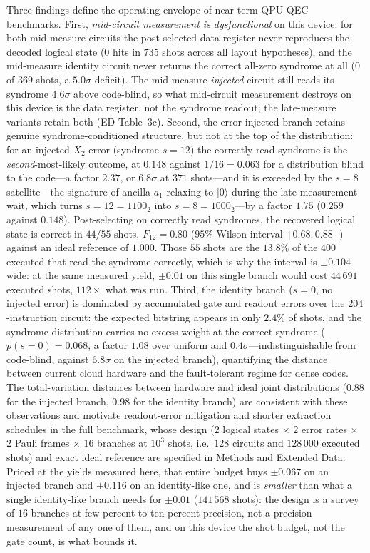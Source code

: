 \documentclass[aps,prxquantum,reprint,superscriptaddress]{revtex4-2}
\newcommand{\ket}[1]{\lvert #1\rangle}
\begin{document}
Three findings define the operating envelope of near-term QPU QEC
benchmarks. First, \emph{mid-circuit measurement is dysfunctional} on this
device: for both mid-measure circuits the post-selected data register never
reproduces the decoded logical state ($0$ hits in $735$ shots across all
layout hypotheses), and the mid-measure identity circuit never returns the
correct all-zero syndrome at all ($0$ of $369$ shots, a $5.0\sigma$ deficit).
The mid-measure \emph{injected} circuit still reads its syndrome $4.6\sigma$
above code-blind, so what mid-circuit measurement destroys on this device is
the data register, not the syndrome readout; the late-measure variants retain
both (ED Table~3c). Second, the error-injected branch retains genuine
syndrome-conditioned structure, but not at the top of the distribution: for an
injected $X_2$ error (syndrome $s=12$) the correctly read syndrome is the
\emph{second}-most-likely outcome, at $0.148$ against $1/16=0.063$ for a
distribution blind to the code---a factor $2.37$, or $6.8\sigma$ at $371$
shots---and it is exceeded by the
$s=8$ satellite---the signature of ancilla $a_1$ relaxing to $\ket 0$ during
the late-measurement wait, which turns $s=12=1100_2$ into $s=8=1000_2$---by a
factor $1.75$ ($0.259$ against $0.148$). Post-selecting on correctly read
syndromes, the recovered logical state is correct in $44/55$ shots,
$F_{12}=0.80$ ($95\%$ Wilson interval $[0.68,0.88]$) against an ideal
reference of $1.000$. Those $55$ shots are the $13.8\%$ of the $400$ executed
that read the syndrome correctly, which is why the interval is $\pm0.104$ wide:
at the same measured yield, $\pm0.01$ on this single branch would cost
$44\,691$ executed shots, $112\times$ what was run. Third, the
identity branch ($s=0$, no injected error) is dominated by accumulated
gate and readout errors over the $204$-instruction circuit: the expected
bitstring appears in only $2.4\%$ of shots, and the syndrome distribution
carries no excess weight at the correct syndrome ($p(s{=}0)=0.068$, a factor
$1.08$ over uniform and $0.4\sigma$---indistinguishable from code-blind,
against $6.8\sigma$ on the injected branch), quantifying the
distance between current cloud hardware and the fault-tolerant regime for dense
codes. The total-variation distances
between hardware and ideal joint distributions ($0.88$ for the injected
branch, $0.98$ for the identity branch) are consistent with these
observations and motivate readout-error mitigation and shorter extraction
schedules in the full benchmark, whose design ($2$ logical states $\times$
$2$ error rates $\times$ $2$ Pauli frames $\times$ $16$ branches at $10^3$
shots, i.e.\ $128$ circuits and $128\,000$ executed shots) and exact ideal
reference are specified in Methods and Extended Data. Priced at the yields
measured here, that entire budget buys $\pm0.067$ on an injected branch and
$\pm0.116$ on an identity-like one, and is \emph{smaller} than what a single
identity-like branch needs for $\pm0.01$ ($141\,568$ shots): the design is a
survey of $16$ branches at few-percent-to-ten-percent precision, not a
precision measurement of any one of them, and on this device the shot budget,
not the gate count, is what bounds it.
\end{document}
